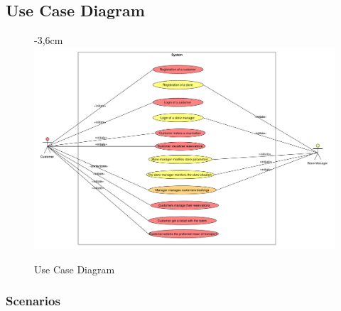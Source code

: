 \documentclass{article}
\begin{document}
		\subsection{Use Case Diagram}
		
		\begin{figure}[!htb]
			\begin{adjustwidth} {-3,6cm}{}
				\centering
				\includegraphics[scale=0.42]{UC/1_useCaseDiagram.pdf}\\
				\caption{Use Case Diagram}
			\end{adjustwidth}
			
		\end{figure}
		
		\subsubsection{Scenarios}
			
\end{document}
